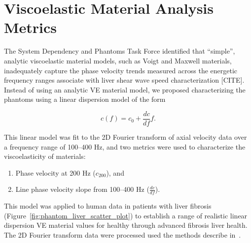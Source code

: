 \section{Viscoelastic Material Analysis Metrics}\label{sect:ve_analysis}

The System Dependency and Phantoms Task Force identified that ``simple'',
analytic viscoelastic material models, such as Voigt and Maxwell materials,
inadequately capture the phase velocity trends measured across the energetic
frequency ranges associate with liver shear wave speed characterization [CITE].
Instead of using an analytic VE material model, we proposed characterizing the
phantoms using a linear dispersion model of the form

\begin{equation}
c(f) = c_0 + \frac{dc}{df} f.
\end{equation}

This linear model was fit to the 2D Fourier transform of axial velocity data
over a frequency range of 100--400 Hz, and two metrics were used to
characterize the viscoelasticity of materials:

\begin{enumerate}
    \item Phase velocity at 200 Hz ($c_{200}$), and
    \item Line phase velocity slope from 100--400 Hz ($\frac{dc}{df}$).
\end{enumerate}

This model was applied to human data in patients with liver
fibrosis~\cite{Palmeri2011} (Figure~\ref{fig:phantom_liver_scatter_plot}) to
establish a range of realistic linear dispersion VE material values for healthy
through advanced fibrosis liver health.  The 2D Fourier transform data were
processed used the methods describe in~\cite{Nightingale2015}.




